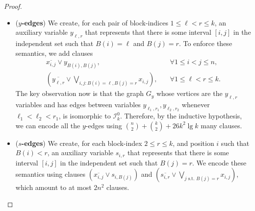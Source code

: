 \documentclass[11pt]{article}
\begin{document}
\begin{proof}
\begin{itemize}

        \item (\textbf{$y$-edges}) We create, for each pair of block-indices $1 \leq \ell < r \leq k$, an auxiliary variable $y_{\ell, r}$ that represents that there is some interval $[i, j]$ in the independent set such that $B(i) = \ell$ and $B(j) = r$. To enforce these semantics, we add clauses 
    \begin{align}
        \overline{x_{i, j}} \lor y_{B(i), B(j)},& \quad \forall 1 \leq i < j \leq n, \label{eq:intro-y}\\
        \left(\overline{y_{\ell, r}} \lor \bigvee_{i, j : B(i) = \ell, B(j) = r} x_{i, j}\right),& \quad \forall 1 \leq \ell < r \leq k.\label{eq:intro-y2}
    \end{align}
       The key observation now is that the graph $G_y$ whose vertices are the $y_{\ell, r}$ variables and has edges between variables $y_{\ell_1, r_1}, y_{\ell_2, r_2}$ whenever $\ell_1 < \ell_2 < r_1$, is isomorphic to $\mathcal{I}^0_{k}$. 
       Therefore, by the inductive hypothesis, we can encode all the $y$-edges using $\binom{n}{2} + \binom{k}{2} + 26 k^2 \lg k$ many clauses.
      \item (\textbf{$s$-edges}) We create, for each block-index $2 \leq r \leq k$, and position $i$ such that $B(i) < r$, an auxiliary variable $s_{i, r}$ that represents that there is some interval $[i, j]$ in the independent set such that $B(j) = r$.
      We encode these semantics using clauses $(\overline{x_{i, j}} \lor s_{i, B(j)})$ and $(\overline{s_{i, r}} \lor \bigvee_{j \text{ s.t. } B(j) = r} x_{i, j})$, which amount to at most $2n^2$ clauses. 

\end{itemize}
\end{proof}
\end{document}
